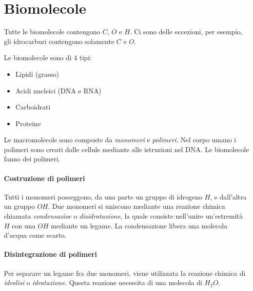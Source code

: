 \documentclass[a4paper]{article}
\begin{document}
\section{Biomolecole}


Tutte le biomolecole contengono \(C\), \(O\) e \(H\).
Ci sono delle eccezioni, per esempio, gli idrocarburi contengono solamente \(C\) e \(O\).

Le biomolecole sono di 4 tipi:
\begin{itemize}
    \item Lipidi (grasso)
    \item Acidi nucleici (DNA e RNA)
    \item Carboidrati
    \item Proteine
\end{itemize}

Le macromolecole sono composte da \textit{monomeri} e \textit{polimeri}.
Nel corpo umano i polimeri sono creati dalle cellule mediante alle istruzioni nel DNA.
Le biomolecole fanno dei polimeri.


\paragraph{Costruzione di polimeri}

Tutti i monomeri posseggono, da una parte un gruppo di idrogeno \(H\),
e dall'altra un gruppo \(OH\).
Due monomeri si uniscono mediante una reazione chimica chiamata \textit{condensazioe} o \textit{disidratazione}, la quale consiste
nell'unire un'estremità \(H\) con una \(OH\) mediante un legame.
La condensazione libera una molecola d'acqua come scarto.

\paragraph{Disintegrazione di polimeri}

Per separare un legame fra due monomeri, viene utilizzata la reazione chimica di \textit{idrolisi} o \textit{idratazione}.
Questa reazione necessita di una molecola di \(H_2O\).

\pagebreak
\end{document}
